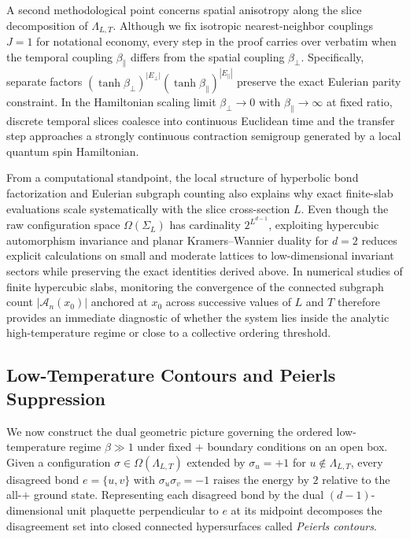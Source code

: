 \documentclass[11pt]{article}
\theoremstyle{definition}
\begin{document}
A second methodological point concerns spatial anisotropy along the slice
decomposition of $\Lambda_{L,T}$. Although we fix isotropic nearest-neighbor
couplings $J = 1$ for notational economy, every step in the proof carries over
verbatim when the temporal coupling $\beta_\parallel$ differs from the spatial
coupling $\beta_\perp$. Specifically, separate factors $(\tanh
\beta_\perp)^{|E_\perp|} (\tanh \beta_\parallel)^{|E_\parallel|}$ preserve the exact
Eulerian parity constraint. In the Hamiltonian scaling limit $\beta_\perp \to 0$
with $\beta_\parallel \to \infty$ at fixed ratio, discrete temporal slices coalesce
into continuous Euclidean time and the transfer step approaches a strongly
continuous contraction semigroup generated by a local quantum spin Hamiltonian.

From a computational standpoint, the local structure of hyperbolic bond
factorization and Eulerian subgraph counting also explains why exact finite-slab
evaluations scale systematically with the slice cross-section $L$. Even though the
raw configuration space $\Omega(\Sigma_L)$ has cardinality $2^{L^{d-1}}$, exploiting
hypercubic automorphism invariance and planar Kramers--Wannier duality for $d = 2$
reduces explicit calculations on small and moderate lattices to low-dimensional
invariant sectors while preserving the exact identities derived above. In numerical
studies of finite hypercubic slabs, monitoring the convergence of the connected
subgraph count $|\mathcal{A}_n(x_0)|$ anchored at $x_0$ across successive values of
$L$ and $T$ therefore provides an immediate diagnostic of whether the system lies
inside the analytic high-temperature regime or close to a collective ordering
threshold.

\subsection{Low-Temperature Contours and Peierls Suppression}
\label{subsec:s04b}

We now construct the dual geometric picture governing the ordered low-temperature
regime $\beta \gg 1$ under fixed $+$ boundary conditions on an open box. Given a
configuration $\sigma \in \Omega(\Lambda_{L,T})$ extended by $\sigma_u = +1$ for $u
\notin \Lambda_{L,T}$, every disagreed bond $e = \{u, v\}$ with $\sigma_u \sigma_v =
-1$ raises the energy by $2$ relative to the all-$+$ ground state. Representing each
disagreed bond by the dual $(d-1)$-dimensional unit plaquette perpendicular to $e$
at its midpoint decomposes the disagreement set into closed connected hypersurfaces
called \emph{Peierls contours}.
\end{document}
